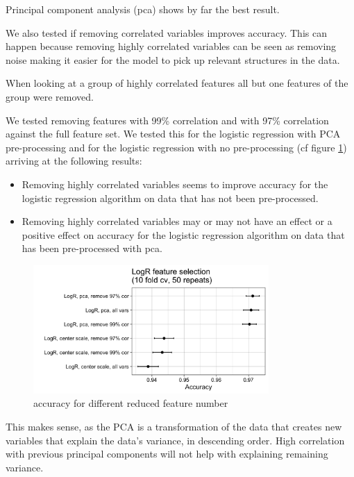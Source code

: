 \documentclass[]{article}
\providecommand{\tightlist}{%
  \setlength{\itemsep}{0pt}\setlength{\parskip}{0pt}}
\begin{document}
Principal component analysis (pca) shows by far the best result.

We also tested if removing correlated variables improves accuracy. This
can happen because removing highly correlated variables can be seen as
removing noise making it easier for the model to pick up relevant
structures in the data.

When looking at a group of highly correlated features all but one
features of the group were removed.

We tested removing features with 99\% correlation and with 97\%
correlation against the full feature set. We tested this for the
logistic regression with PCA pre-processing and for the logistic
regression with no pre-processing (cf figure
\ref{fig:feature-reduction-options}) arriving at the following results:

\begin{itemize}
\tightlist
\item
  Removing highly correlated variables seems to improve accuracy for the
  logistic regression algorithm on data that has not been pre-processed.
\item
  Removing highly correlated variables may or may not have an effect or
  a positive effect on accuracy for the logistic regression algorithm on
  data that has been pre-processed with pca.
\end{itemize}

\begin{figure}
    \centering
    \includegraphics[width=0.8\textwidth]{images/feature-selection.png}
    \caption{accuracy for different reduced feature number}
    \label{fig:feature-reduction-options}
\end{figure}

This makes sense, as the PCA is a transformation of the data that
creates new variables that explain the data's variance, in descending
order. High correlation with previous principal components will not help
with explaining remaining variance.
\end{document}
